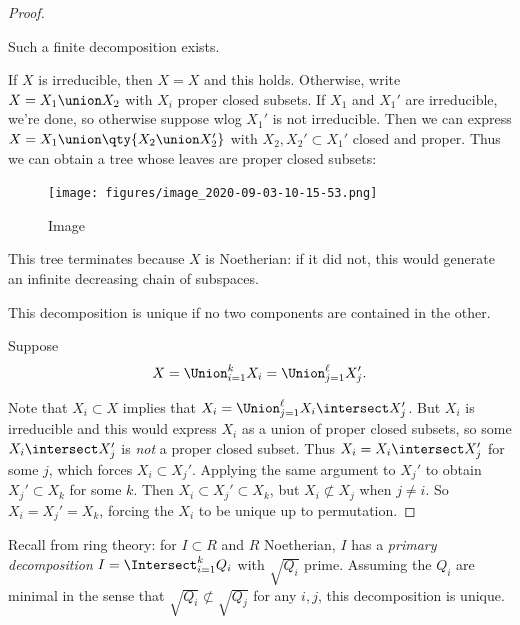 \begin{proof}

\begin{claim}

Such a finite decomposition exists.

\end{claim}

If \(X\) is irreducible, then \(X=X\) and this holds. Otherwise, write
\(X = X_1 \union X_2\) with \(X_i\) proper closed subsets. If \(X_1\)
and \(X_1'\) are irreducible, we're done, so otherwise suppose wlog
\(X_1'\) is not irreducible. Then we can express
\(X = X_1 \union \qty{X_2 \union X_2'}\) with \(X_2, X_2' \subset X_1'\)
closed and proper. Thus we can obtain a tree whose leaves are proper
closed subsets:

\begin{figure}
\centering
\texttt{[image: figures/image\_2020-09-03-10-15-53.png]}
\caption{Image}
\end{figure}

This tree terminates because \(X\) is Noetherian: if it did not, this
would generate an infinite decreasing chain of subspaces.

\begin{claim}

This decomposition is unique if no two components are contained in the
other.

\end{claim}

Suppose
\begin{align*}  
X= \Union_{i=1}^k X_i = \Union_{j=1}^\ell X_j'
.\end{align*}

Note that \(X_i \subset X\) implies that
\(X_i = \Union_{j=1}^\ell X_i \intersect X_j'\). But \(X_i\) is
irreducible and this would express \(X_i\) as a union of proper closed
subsets, so some \(X_i \intersect X_j'\) is \emph{not} a proper closed
subset. Thus \(X_i = X_i \intersect X_j'\) for some \(j\), which forces
\(X_i \subset X_j'\). Applying the same argument to \(X_j'\) to obtain
\(X_j' \subset X_k\) for some \(k\). Then
\(X_i \subset X_j' \subset X_k\), but \(X_ i \not\subset X_j\) when
\(j\neq i\). So \(X_i = X_j' = X_k\), forcing the \(X_i\) to be unique
up to permutation.

\end{proof}

Recall from ring theory: for \(I\subset R\) and \(R\) Noetherian, \(I\)
has a \emph{primary decomposition} \(I = \Intersect_{i=1}^k Q_i\) with
\(\sqrt{Q_i}\) prime. Assuming the \(Q_i\) are minimal in the sense that
\(\sqrt{Q_i} \not\subset \sqrt{Q_j}\) for any \(i, j\), this
decomposition is unique.

